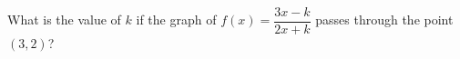 What is the value of $k$ if the graph of $f(x)=\dfrac{3x-k}{2x+k}$ passes through the point $(3,2)$?
